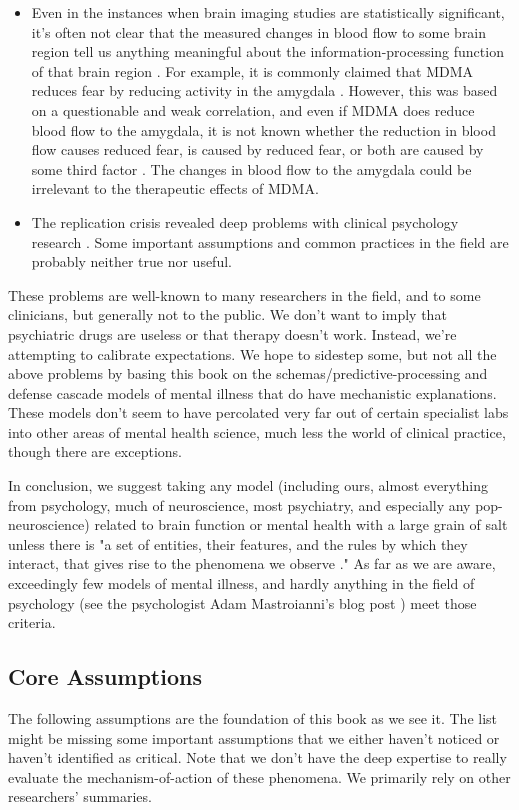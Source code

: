\documentclass[12pt,letterpaper]{book}
\begin{document}
\begin{itemize}
    \item Even in the instances when brain imaging studies are statistically significant, it's often not clear that the measured changes in blood flow to some brain region tell us anything meaningful about the information-processing function of that brain region \cite{jonas2017microprocessor,dewit2016neuroimaging,alikoEntireBrain}. For example, it is commonly claimed that MDMA reduces fear by reducing activity in the amygdala \cite{fedduciaMDMAMemoryReconsolidation}. However, this was based on a questionable and weak correlation, and even if MDMA does reduce blood flow to the amygdala, it is not known whether the reduction in blood flow causes reduced fear, is caused by reduced fear, or both are caused by some third factor \cite{mdmaNeuroimaging}. The changes in blood flow to the amygdala could be irrelevant to the therapeutic effects of MDMA.
    \item The replication crisis revealed deep problems with clinical psychology research \cite{therapyReplicationCrisis}. Some important assumptions and common practices in the field are probably neither true nor useful.
\end{itemize}
These problems are well-known to many researchers in the field, and to some clinicians, but generally not to the public. We don't want to imply that psychiatric drugs are useless or that therapy doesn't work. Instead, we're attempting to calibrate expectations. We hope to sidestep some, but not all the above problems by basing this book on the schemas/predictive-processing and defense cascade models of mental illness that do have mechanistic explanations. These models don't seem to have percolated very far out of certain specialist labs into other areas of mental health science, much less the world of clinical practice, though there are exceptions.

In conclusion, we suggest taking any model (including ours, almost everything from psychology, much of neuroscience, most psychiatry, and especially any pop-neuroscience) related to brain function or mental health with a large grain of salt unless there is "a set of entities, their features, and the rules by which they interact, that gives rise to the phenomena we observe \cite{mechanisticModels}." As far as we are aware, exceedingly few models of mental illness, and hardly anything in the field of psychology (see the psychologist Adam Mastroianni's blog post \textcite{MastroianniPsychology}) meet those criteria.

\subsection*{Core Assumptions}
The following assumptions are the foundation of this book as we see it. The list might be missing some important assumptions that we either haven't noticed or haven't identified as critical. Note that we don't have the deep expertise to really evaluate the mechanism-of-action of these phenomena. We primarily rely on other researchers' summaries.
\end{document}
